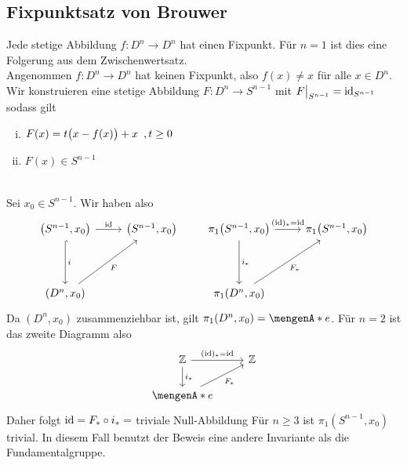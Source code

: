 \subsection{Fixpunktsatz von Brouwer} %
\label{sub:11.8}
Jede stetige Abbildung $f : D^n \to D^n$ hat einen Fixpunkt.
Für $n=1$ ist dies eine Folgerung aus dem Zwischenwertsatz. \smallskip \\
Angenommen $f : D^n \to D^n$ hat keinen Fixpunkt, also $f(x) \not= x$ für alle $x \in D^n$. Wir konstruieren eine stetige Abbildung $F : D^n \to S^{n-1}$ mit 
$F\big|_{S^{n-1}} = \id_{S^{n-1}}$ sodass gilt \\
\begin{minipage}{0.45\textwidth}
	\begin{enumerate}[(i)]
		\item $F(x) = t \enbrace[\big]{x- f(x)} + x \enspace, t\ge 0$
		\item $F(x) \in S^{n-1}$
	\end{enumerate}
\end{minipage} \quad 
\begin{minipage}{0.5\textwidth}
	\captionsetup{type=figure, skip=4pt, name=Abb.}
\end{minipage} \\
Sei $x_0 \in S^{n-1}$. Wir haben also
\[
	\begin{tikzcd}[row sep=4em]
		\enbrace*{S^{n-1}, x_0} \rar{\id} \dar[hook]{i} & \enbrace*{S^{n-1}, x_0} \\
		\enbrace*{D^n, x_0} \urar[swap]{F}
	\end{tikzcd}
	\qquad \begin{tikzcd}[row sep=4em]
		\pi_1 \enbrace*{S^{n-1}, x_0} \rar{(\id)_* = \id}  \dar{i_*}& \pi_1 \enbrace*{S^{n-1}, x_0} \\
		\pi_1 \enbrace*{D^n, x_0} \urar[swap]{F_*}   
	\end{tikzcd}
\]
Da $(D^n, x_0)$ zusammenziehbar ist, gilt $\pi_1 \enbrace*{D^n, x_0} = \set{e}$.
Für $n=2$ ist das zweite Diagramm also
\[
	\begin{tikzcd}
			\mathds{Z} \rar{(\id)_* = \id}  \dar{i_*}& \mathds{Z} \\
			\set{e} \urar[swap]{F_*} 
		\end{tikzcd}
\]
Daher folgt $\id = F_* \circ  i_* =$ triviale Null-Abbildung \light \bewende
{}
Für $n \ge 3$ ist $\pi_1(S^{n-1}, x_0)$ trivial. In diesem Fall benutzt der Beweis eine andere Invariante als die Fundamentalgruppe.

